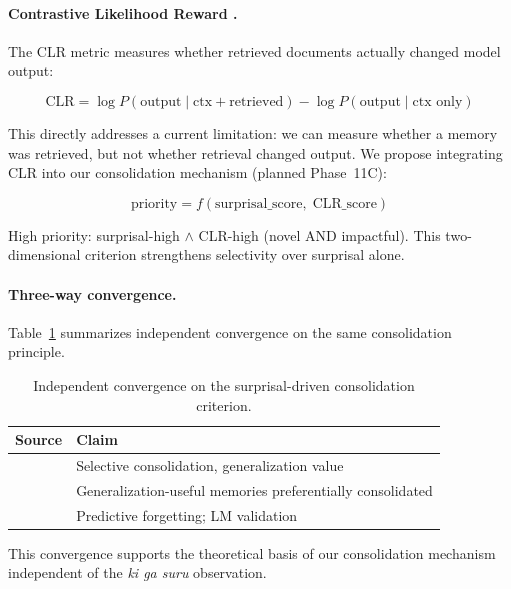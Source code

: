 \documentclass[11pt]{article}
\begin{document}
\paragraph{Contrastive Likelihood Reward \citep{tan2026ctrlrag}.}
The CLR metric measures whether retrieved documents actually changed
model output:

\begin{equation}
  \text{CLR} = \log P(\text{output} \mid \text{ctx} + \text{retrieved})
               - \log P(\text{output} \mid \text{ctx only})
\end{equation}

This directly addresses a current limitation: we can measure whether
a memory was retrieved, but not whether retrieval changed output.
We propose integrating CLR into our consolidation mechanism (planned
Phase~11C):

\begin{equation}
  \text{priority} = f(\text{surprisal\_score},\; \text{CLR\_score})
\end{equation}

High priority: surprisal-high $\wedge$ CLR-high (novel AND impactful).
This two-dimensional criterion strengthens selectivity over surprisal
alone.

\paragraph{Three-way convergence.}
Table~\ref{tab:convergence} summarizes independent convergence on the
same consolidation principle.

\begin{table}[h]
\centering
\small
\begin{tabular}{ll}
\toprule
\textbf{Source} & \textbf{Claim} \\
\midrule
\citet{mcclelland1995} &
  Selective consolidation, generalization value \\
\citet{sun2023organizing} &
  Generalization-useful memories preferentially consolidated \\
\citet{fountas2026} &
  Predictive forgetting; LM validation \\
\bottomrule
\end{tabular}
\caption{Independent convergence on the surprisal-driven consolidation
criterion.}
\label{tab:convergence}
\end{table}

This convergence supports the theoretical basis of our consolidation
mechanism independent of the \textit{ki ga suru} observation.
\end{document}
